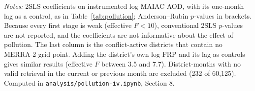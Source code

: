 \documentclass[12pt]{article}
\begin{document}
\begin{table}[H]
\centering
\caption{Instrumenting MODIS MAIAC aerosol optical depth with upwind fire}
\label{tab:maiac}
\begin{minipage}{0.95\textwidth}
\vspace{4pt}
\footnotesize \emph{Notes:} 2SLS coefficients on instrumented log MAIAC AOD, with its one-month lag as a control, as in Table~\ref{tab:pollution}; Anderson--Rubin $p$-values in brackets. Because every first stage is weak (effective $F < 10$), conventional 2SLS $p$-values are not reported, and the coefficients are not informative about the effect of pollution. The last column is the conflict-active districts that contain no MERRA-2 grid point. Adding the district's own log FRP and its lag as controls gives similar results (effective $F$ between 3.5 and 7.7). District-months with no valid retrieval in the current or previous month are excluded (232 of 60,125). Computed in \texttt{analysis/pollution-iv.ipynb}, Section 8.
\end{minipage}
\end{table}



\end{document}

